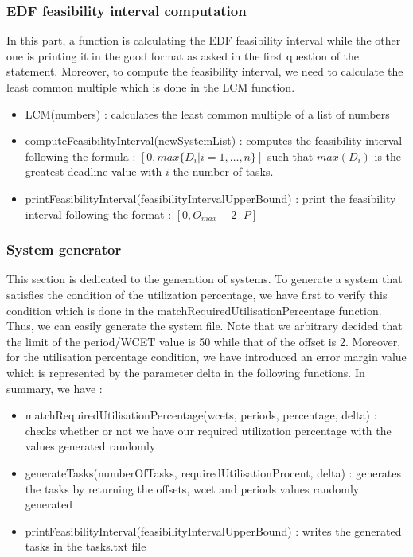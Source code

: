 \documentclass{article}
\begin{document}
\subsubsection{EDF feasibility interval computation}
In this part, a function is calculating the EDF feasibility interval while the other one is printing it in the good format as asked in the first question of the statement. Moreover, to compute the feasibility interval, we need to calculate the least common multiple which is done in the {\selectfont LCM} function. 

\begin{itemize}
    \item {\selectfont LCM(numbers)} : calculates the least common multiple of a list of numbers 
    \item {\selectfont computeFeasibilityInterval(newSystemList)} : computes the feasibility interval following the formula :  $[0, max\{D_{i} | i = 1, … , n\}]$ such that $max(D_{i})$ is the greatest deadline value with $i$ the number of tasks.   
    \item {\selectfont printFeasibilityInterval(feasibilityIntervalUpperBound)} : print the feasibility interval following the format : $[0, O_{max} + 2 \cdot P]$
\end{itemize}

\subsubsection{System generator}
This section is dedicated to the generation of systems. To generate a system that satisfies the condition of the utilization percentage, we have first to verify this condition which is done in the {\selectfont matchRequiredUtilisationPercentage} function. Thus, we can easily generate the system file. Note that we arbitrary decided that the limit of the period/WCET value is 50 while that of the offset is 2. Moreover, for the utilisation percentage condition, we have introduced an error margin value which is represented by the parameter {\selectfont delta} in the following functions. In summary, we have : 

\begin{itemize}
    \item {\selectfont matchRequiredUtilisationPercentage(wcets, periods, percentage, delta)} :  checks whether or not we have our required utilization percentage with the values generated randomly
    \item {\selectfont generateTasks(numberOfTasks, requiredUtilisationProcent, delta)} : generates the tasks by returning the offsets, wcet and periods values randomly generated   
    \item {\selectfont printFeasibilityInterval(feasibilityIntervalUpperBound)} : writes the generated tasks in the {\selectfont tasks.txt} file
\end{itemize}
\end{document}
